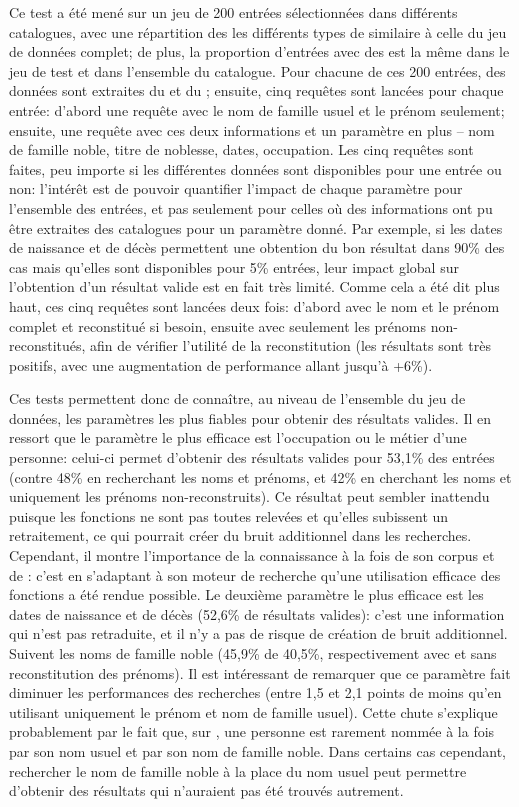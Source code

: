 Ce test a été mené sur un jeu de 200 entrées sélectionnées dans différents catalogues, avec une répartition des les différents types de \tname{} similaire à celle du jeu de données complet; de plus, la proportion d'entrées avec des \ttrait{} est la même dans le jeu de test et dans l'ensemble du catalogue. Pour chacune de ces 200 entrées, des données sont extraites du \tname{} et du \ttrait{}; ensuite, cinq requêtes sont lancées pour chaque entrée: d'abord une requête avec le nom de famille usuel et le prénom seulement; ensuite, une requête avec ces deux informations et un paramètre en plus -- nom de famille noble, titre de noblesse, dates, occupation. Les cinq requêtes sont faites, peu importe si les différentes données sont disponibles pour une entrée ou non: l'intérêt est de pouvoir quantifier l'impact de chaque paramètre pour l'ensemble des entrées, et pas seulement pour celles où des informations ont pu être extraites des catalogues pour un paramètre donné. Par exemple, si les dates de naissance et de décès permettent une obtention du bon résultat dans 90\% des cas mais qu'elles sont disponibles pour 5\% entrées, leur impact global sur l'obtention d'un résultat valide est en fait très limité. Comme cela a été dit plus haut, ces cinq requêtes sont lancées deux fois: d'abord avec le nom et le prénom complet et reconstitué si besoin, ensuite avec seulement les prénoms non-reconstitués, afin de vérifier l'utilité de la reconstitution (les résultats sont très positifs, avec une augmentation de performance allant jusqu'à +6\%).

Ces tests permettent donc de connaître, au niveau de l'ensemble du jeu de données, les paramètres les plus fiables pour obtenir des résultats valides. Il en ressort que le paramètre le plus efficace est l'occupation ou le métier d'une personne: celui-ci permet d'obtenir des résultats valides pour 53,1\% des entrées (contre 48\% en recherchant les noms et prénoms, et 42\% en cherchant les noms et uniquement les prénoms non-reconstruits). Ce résultat peut sembler inattendu puisque les fonctions ne sont pas toutes relevées et qu'elles subissent un retraitement, ce qui pourrait créer du bruit additionnel dans les recherches. Cependant, il montre l'importance de la connaissance à la fois de son corpus et de \wkd{}: c'est en s'adaptant à son moteur de recherche qu'une utilisation efficace des fonctions a été rendue possible. Le deuxième paramètre le plus efficace est les dates de naissance et de décès (52,6\% de résultats valides): c'est une information qui n'est pas retraduite, et il n'y a pas de risque de création de bruit additionnel. Suivent les noms de famille noble (45,9\% de 40,5\%, respectivement avec et sans reconstitution des prénoms). Il est intéressant de remarquer que ce paramètre fait diminuer les performances des recherches (entre 1,5 et 2,1 points de moins qu'en utilisant uniquement le prénom et nom de famille usuel). Cette chute s'explique probablement par le fait que, sur \wkd{}, une personne est rarement nommée à la fois par son nom usuel et par son nom de famille noble. Dans certains cas cependant, rechercher le nom de famille noble à la place du nom usuel peut permettre d'obtenir des résultats qui n'auraient pas été trouvés autrement.

